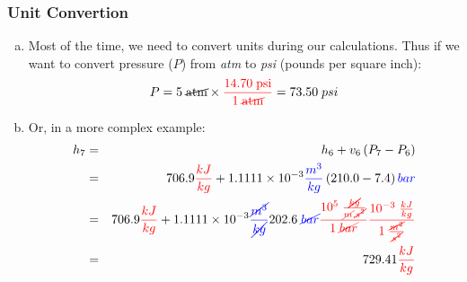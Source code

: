 \documentclass[10pt,compress]{beamer}
\begin{document}

\begin{frame}
 \frametitle{Unit Convertion}
  \begin{enumerate}[(a)]
   \item<1-> Most of the time, we need to convert units during our calculations. Thus if we want to convert pressure ($P$) from {\it atm} to {\it psi} (pounds per square inch):
      \begin{displaymath}
        P = 5\;\cancel{\text{atm}} \times \textcolor{red}{\displaystyle\frac{14.70\;\text{psi}}{1\;\cancel{\text{atm}}}} = 73.50\;psi
      \end{displaymath}
   \item<2-> Or, in a more complex example:
      \begin{eqnarray}
        h_{7} &=& h_{6} + v_{6}\left(P_{7}-P_{6}\right) \nonumber \\
              &=& 706.9\textcolor{red}{\frac{kJ}{kg}} + 1.1111\times 10^{-3}\textcolor{blue}{\frac{m^{3}}{kg}}\left(210.0-7.4\right)\textcolor{blue}{bar} \nonumber \\
              &=& 706.9\textcolor{red}{\frac{kJ}{kg}} + 1.1111\times 10^{-3}\textcolor{blue}{\frac{\cancel{m^{3}}}{\cancel{kg}}} 202.6\;\textcolor{blue}{\cancel{bar}} \textcolor{red}{\frac{10^{5}\;\frac{\cancel{kg}}{\cancel{m}.\cancel{s^{2}}}}{1\; \cancel{bar}}} \textcolor{red}{\frac{10^{-3}\; \frac{kJ}{kg}}{1\;\frac{\cancel{m^{2}}}{\cancel{s^{2}}}}} \nonumber \\
              &=& 729.41\textcolor{red}{\frac{kJ}{kg}} \nonumber 
      \end{eqnarray} 
  \end{enumerate}
\end{frame}
\end{document}
